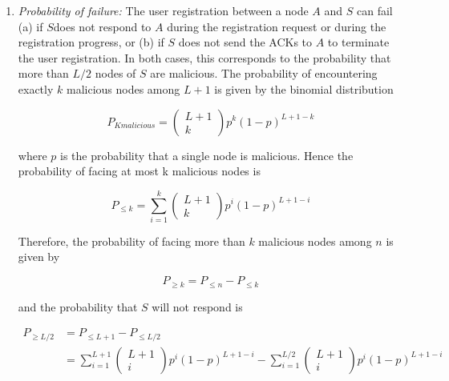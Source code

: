   \begin{enumerate}
    \item{\textit{Probability of failure:}}
    The user registration between a node $A$ and $S$ can fail (a) if $S$does
not respond to $A$ during the registration request or during the registration
progress, or (b) if $S$ does not send the ACKs to $A$ to terminate the user
registration. In both cases, this corresponds to the probability that more than
$L/2$ nodes of $S$ are malicious. The probability of encountering exactly $k$
malicious nodes among $L +1$ is given by the binomial distribution

    \begin{equation}
      P_{K malicious} = \begin{pmatrix} L+1 \\ k\end{pmatrix} p^k (1-p)^{L+1-k}
    \end{equation}

    where $p$ is the probability that a single node is malicious. Hence the
probability of facing at most k malicious nodes is 

    \begin{equation}
      P_{\leq k} = \sum_{i=1}^{k} \begin{pmatrix} L+1 \\ k\end{pmatrix} p^i (1-p)^{L+1-i}
    \end{equation}

    Therefore, the probability of facing more than $k$ malicious nodes among
$n$ is given by

    \begin{equation}
      P_{\ge k} = P_{\leq n} - P_{\leq k}
    \end{equation}

    and the probability that $S$ will not respond is

    \begin{align}
      P_{\ge L/2} &= P_{\leq L+1} - P_{\leq L/2} \\
      &= \sum_{i=1}^{L+1} \begin{pmatrix} L+1 \\ i\end{pmatrix} p^i (1-p)^{L+1-i}
      - \sum_{i=1}^{L/2} \begin{pmatrix} L+1 \\ i\end{pmatrix} p^i (1-p)^{L+1-i}
    \end{align}


\end{enumerate}

